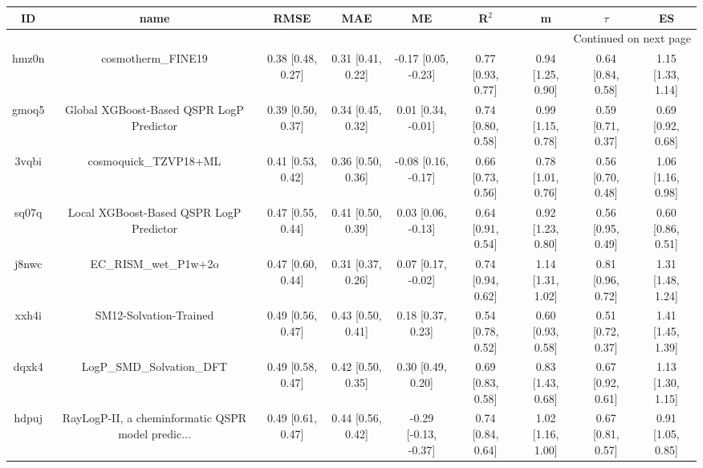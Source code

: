 \documentclass{article}
\begin{document}
\begin{center}
\scriptsize
\begin{longtable}{|ccccccccc|}
\toprule
    ID &                                               name &               RMSE &                MAE &                    ME &              R$^2$ &                     m &                $\tau$ &                    ES \\
\midrule
\endhead
\midrule
\multicolumn{9}{r}{{Continued on next page}} \\
\midrule
\endfoot

\bottomrule
\endlastfoot
 hmz0n &                                 cosmotherm\_FINE19 &  0.38 [0.48, 0.27] &  0.31 [0.41, 0.22] &   -0.17 [0.05, -0.23] &  0.77 [0.93, 0.77] &     0.94 [1.25, 0.90] &     0.64 [0.84, 0.58] &     1.15 [1.33, 1.14] \\
 gmoq5 &           Global XGBoost-Based QSPR LogP Predictor &  0.39 [0.50, 0.37] &  0.34 [0.45, 0.32] &    0.01 [0.34, -0.01] &  0.74 [0.80, 0.58] &     0.99 [1.15, 0.78] &     0.59 [0.71, 0.37] &     0.69 [0.92, 0.68] \\
 3vqbi &                              cosmoquick\_TZVP18+ML &  0.41 [0.53, 0.42] &  0.36 [0.50, 0.36] &   -0.08 [0.16, -0.17] &  0.66 [0.73, 0.56] &     0.78 [1.01, 0.76] &     0.56 [0.70, 0.48] &     1.06 [1.16, 0.98] \\
 sq07q &            Local XGBoost-Based QSPR LogP Predictor &  0.47 [0.55, 0.44] &  0.41 [0.50, 0.39] &    0.03 [0.06, -0.13] &  0.64 [0.91, 0.54] &     0.92 [1.23, 0.80] &     0.56 [0.95, 0.49] &     0.60 [0.86, 0.51] \\
 j8nwc &                              EC\_RISM\_wet\_P1w+2o &  0.47 [0.60, 0.44] &  0.31 [0.37, 0.26] &    0.07 [0.17, -0.02] &  0.74 [0.94, 0.62] &     1.14 [1.31, 1.02] &     0.81 [0.96, 0.72] &     1.31 [1.48, 1.24] \\
 xxh4i &                             SM12-Solvation-Trained &  0.49 [0.56, 0.47] &  0.43 [0.50, 0.41] &     0.18 [0.37, 0.23] &  0.54 [0.78, 0.52] &     0.60 [0.93, 0.58] &     0.51 [0.72, 0.37] &     1.41 [1.45, 1.39] \\
 dqxk4 &                          LogP\_SMD\_Solvation\_DFT &  0.49 [0.58, 0.47] &  0.42 [0.50, 0.35] &     0.30 [0.49, 0.20] &  0.69 [0.83, 0.58] &     0.83 [1.43, 0.68] &     0.67 [0.92, 0.61] &     1.13 [1.30, 1.15] \\
 hdpuj &  RayLogP-II, a cheminformatic QSPR model predic... &  0.49 [0.61, 0.47] &  0.44 [0.56, 0.42] &  -0.29 [-0.13, -0.37] &  0.74 [0.84, 0.64] &     1.02 [1.16, 1.00] &     0.67 [0.81, 0.57] &     0.91 [1.05, 0.85] \\

\end{longtable}
\end{center}
\end{document}

